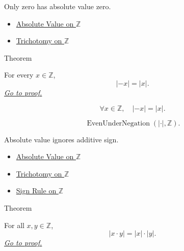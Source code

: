 \begin{remark*}[Interpretation]
Only zero has absolute value zero.
\end{remark*}

\begin{dependencies}
\begin{itemize}
  \item \hyperref[def:absolute-value-on-z]{Absolute Value on $\mathbb{Z}$}
  \item \hyperref[thm:trichotomy-on-z]{Trichotomy on $\mathbb{Z}$}
\end{itemize}
\end{dependencies}

\begin{theorembox}{Theorem}
\begin{theorem}
\label{thm:absolute-value-negation-on-z}
For every $x\in\mathbb{Z}$,
\[
|-x|=|x|.
\]
\hyperref[prf:absolute-value-negation-on-z]{\textit{Go to proof.}}
\end{theorem}
\end{theorembox}

\begin{remark*}
\[
\forall x\in\mathbb{Z},\quad |-x|=|x|.
\]
\end{remark*}

\begin{remark*}
\[
\operatorname{EvenUnderNegation}(|\cdot|,\mathbb{Z}).
\]
\end{remark*}

\begin{remark*}[Interpretation]
Absolute value ignores additive sign.
\end{remark*}

\begin{dependencies}
\begin{itemize}
  \item \hyperref[def:absolute-value-on-z]{Absolute Value on $\mathbb{Z}$}
  \item \hyperref[thm:trichotomy-on-z]{Trichotomy on $\mathbb{Z}$}
  \item \hyperref[cor:sign-rule-on-z]{Sign Rule on $\mathbb{Z}$}
\end{itemize}
\end{dependencies}

\begin{theorembox}{Theorem}
\begin{theorem}
\label{thm:absolute-value-multiplicative-on-z}
For all $x,y\in\mathbb{Z}$,
\[
|x\cdot y|=|x|\cdot |y|.
\]
\hyperref[prf:absolute-value-multiplicative-on-z]{\textit{Go to proof.}}
\end{theorem}
\end{theorembox}

